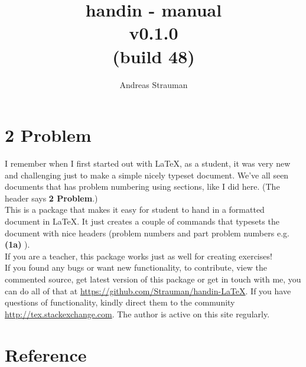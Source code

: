 \documentclass{article}
\title{{handin - manual\\ v0.1.0{\\[-0.5em]\footnotesize(build 48)}}}
\author{Andreas Strauman}
\let\oldsection\section
\gdef\section{\needspace{0.3\paperheight}\oldsection}
\begin{document}
\maketitle
\section*{2 Problem}
I remember when I first started out with LaTeX, as a student, it was very new and challenging just to make a simple nicely typeset document. We've all seen documents that has problem numbering using sections, like I did here. (The header says \textbf{2 Problem}.)\\

This is a package that makes it easy for student to hand in a formatted document in LaTeX. It just creates a couple of commands that typesets the document with nice headers (problem numbers and part problem numbers e.g. \textbf{(1a)} ).\\

If you are a teacher, this package works just as well for creating exercises!\\
 
If you found any bugs or want new functionality, to contribute, view the commented source, get latest version of this package or get in touch with me, you can do all of that at \url{https://github.com/Strauman/handin-LaTeX}. If you have questions of functionality, kindly direct them to the community\\ \url{http://tex.stackexchange.com}. The author is active on this site regularly.

\tableofcontents
\clearpage
 \section{Reference}
\end{document}
